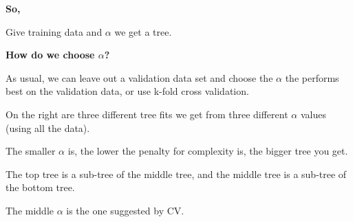 \documentclass{beamer}
\newcommand{\bl}{\color{lightblue}}
\newcommand{\rd}{\color{burntorange}}
\newcommand{\skoo}{\vspace{.2in}}
\begin{document}
\begin{frame}

{\bl \bf So,}\skoo

Give training data and $\alpha$ we get a tree.\skoo

{\rd \bf How do we choose $\alpha$?}\skoo

As usual, we can leave out a validation data set and choose the $\alpha$ the performs
best on the validation data, or use k-fold cross validation.
\end{frame}
\begin{frame}

\begin{minipage}{1.2in}
{\scriptsize
On the right are three different tree fits
we get from three different $\alpha$ values
(using all the data).

\vspace{.2in}

The smaller $\alpha$ is,
the lower the penalty for complexity is,
the bigger tree you get.\skoo

The top tree is a sub-tree of the middle tree,
and the middle tree is a sub-tree of the bottom tree.\skoo



The middle $\alpha$ is the one suggested by CV.

}
\end{minipage}
\end{frame}
\end{document}
